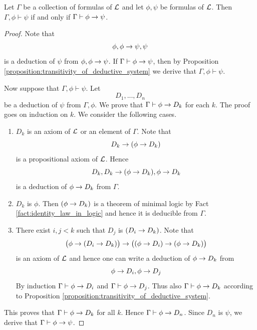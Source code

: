\documentclass[10pt]{amsart}
\begin{document}
\begin{theorem}\label{theorem:deduction_theorem}
	Let $\Gamma$ be a collection of formulas of ${\mathcal L}$ and let $\phi, \psi$ be formulas of ${\mathcal L}$. Then $\Gamma,\phi \vdash \psi$ if and only if $\Gamma \vdash \phi \rightarrow \psi$.
\end{theorem}
\begin{proof}
	Note that
	$$\phi, \phi \rightarrow \psi , \psi$$
	is a deduction of $\psi$ from $\phi, \phi \rightarrow \psi$. If $\Gamma \vdash \phi \rightarrow \psi$, then by Proposition \ref{proposition:transitivity_of_deductive_system} we derive that $\Gamma,\phi \vdash \psi$.

	Now suppose that $\Gamma,\phi \vdash \psi$. Let
	$$D_1 , ..., D_n$$
	be a deduction of $\psi$ from $\Gamma, \phi$. We prove that $\Gamma \vdash \phi \rightarrow D_k$ for each $k$. The proof goes on induction on $k$. We consider the following cases.
	\begin{enumerate}[label=\textbf{(\arabic*)}, leftmargin=3.0em]
		\item $D_k$ is an axiom of ${\mathcal L}$ or an element of $\Gamma$. Note that
		      $$D_k \rightarrow (\phi \rightarrow D_k )$$
		      is a propositional axiom of ${\mathcal L}$. Hence
		      $$D_k,D_k \rightarrow (\phi \rightarrow D_k),\phi \rightarrow D_k$$
		      is a deduction of $\phi \rightarrow D_k$ from $\Gamma$.
		\item $D_k$ is $\phi$. Then $(\phi \rightarrow D_k)$ is a theorem of minimal logic by Fact \ref{fact:identity_law_in_logic} and hence it is deducible from $\Gamma$.
		\item There exist $i, j < k$ such that $D_j$ is $(D_i \rightarrow D_k)$. Note that
		      $$\big(\phi \rightarrow (D_i \rightarrow D_k)\big) \rightarrow \big((\phi \rightarrow D_i ) \rightarrow (\phi \rightarrow D_k)\big)$$
		      is an axiom of ${\mathcal L}$ and hence one can write a deduction of $\phi \rightarrow D_k$ from
		      $$\phi \rightarrow D_i,\phi \rightarrow D_j$$
		      By induction $\Gamma \vdash \phi \rightarrow D_i$ and $\Gamma \vdash \phi \rightarrow D_j$. Thus also $\Gamma \vdash \phi \rightarrow D_k$ according to Proposition \ref{proposition:transitivity_of_deductive_system}.
	\end{enumerate}
	This proves that $\Gamma \vdash \phi \rightarrow D_k$ for all $k$. Hence $\Gamma \vdash \phi \rightarrow D_n$. Since $D_n$ is $\psi$, we derive that $\Gamma \vdash \phi \rightarrow \psi$.
\end{proof}
\end{document}
